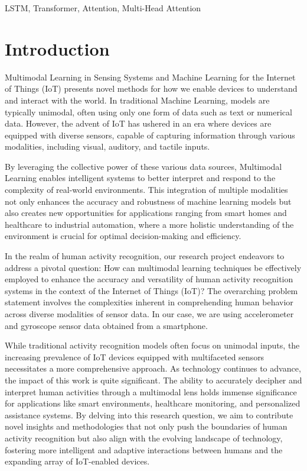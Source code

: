 \documentclass[conference]{IEEEtran}
\begin{document}
\begin{IEEEkeywords}
LSTM, Transformer, Attention, Multi-Head Attention
\end{IEEEkeywords}

\section{Introduction}

Multimodal Learning in Sensing Systems and Machine Learning for the Internet of Things (IoT) presents novel methods for how we enable devices to understand and interact with the world. In traditional Machine Learning, models are typically unimodal, often using only one form of data such as text or numerical data. However, the advent of IoT has ushered in an era where devices are equipped with diverse sensors, capable of capturing information through various modalities, including visual, auditory, and tactile inputs. \newline 

By leveraging the collective power of these various data sources, Multimodal Learning enables intelligent systems to better interpret and respond to the complexity of real-world environments. This integration of multiple modalities not only enhances the accuracy and robustness of machine learning models but also creates new opportunities for applications ranging from smart homes and healthcare to industrial automation, where a more holistic understanding of the environment is crucial for optimal decision-making and efficiency. \newline 

In the realm of human activity recognition, our research project endeavors to address a pivotal question: How can multimodal learning techniques be effectively employed to enhance the accuracy and versatility of human activity recognition systems in the context of the Internet of Things (IoT)? The overarching problem statement involves the complexities inherent in comprehending human behavior across diverse modalities of sensor data. In our case, we are using accelerometer and gyroscope 
sensor data obtained from a smartphone. \newline 

While traditional activity recognition models often focus on unimodal inputs, the increasing prevalence of IoT devices equipped with multifaceted sensors necessitates a more comprehensive approach. As technology continues to advance, the impact of this work is quite significant. The ability to accurately decipher and interpret human activities through a multimodal lens holds immense significance for applications like smart environments, healthcare monitoring, and personalized assistance systems. By delving into this research question, we aim to contribute novel insights and methodologies that not only push the boundaries of human activity recognition but also align with the evolving landscape of technology, fostering more intelligent and adaptive interactions between humans and the expanding array of IoT-enabled devices. \newline 
\end{document}
